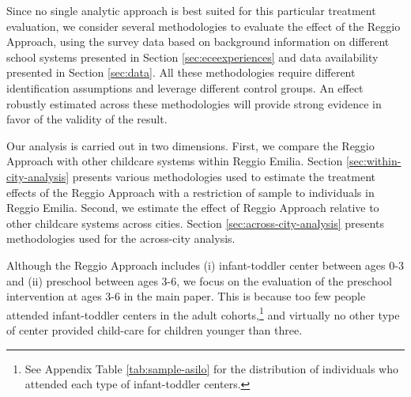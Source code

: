 Since no single analytic approach is best suited for this particular treatment evaluation, we consider several methodologies to evaluate the effect of the Reggio Approach, using the survey data based on background information on different school systems presented in Section \ref{sec:eceexperiences} and data availability presented in Section \ref{sec:data}. All these methodologies require different identification assumptions and leverage different control groups. An effect robustly estimated across these methodologies will provide strong evidence in favor of the validity of the result.

Our analysis is carried out in two dimensions. First, we compare the Reggio Approach with other childcare systems within Reggio Emilia. Section \ref{sec:within-city-analysis} presents various methodologies used to estimate the treatment effects of the Reggio Approach with a restriction of sample to individuals in Reggio Emilia. Second, we estimate the effect of Reggio Approach relative to other childcare systems across cities. Section \ref{sec:across-city-analysis} presents methodologies used for the across-city analysis.

Although the Reggio Approach includes (i) infant-toddler center between ages 0-3 and (ii) preschool between ages 3-6, we focus on the evaluation of the preschool intervention at ages 3-6 in the main paper. This is because too few people attended infant-toddler centers in the adult cohorts,\footnote{See Appendix Table \ref{tab:sample-asilo} for the distribution of individuals who attended each type of infant-toddler centers.} and virtually no other type of center provided child-care for children younger than three.


